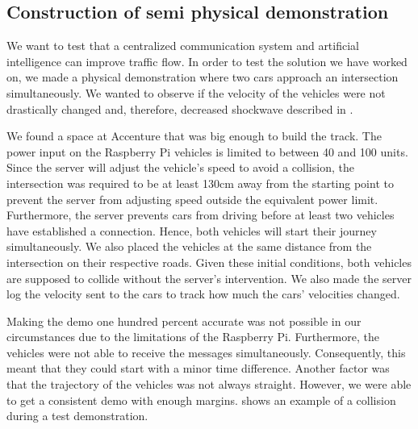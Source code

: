 \subsection{Construction of semi physical demonstration}\label{sec:demo}
We want to test that a centralized communication system and artificial intelligence can improve traffic flow. In order to test the solution we have worked on, we made a physical demonstration where two cars approach an intersection simultaneously. We wanted to observe if the velocity of the vehicles were not drastically changed and, therefore, decreased shockwave described in .

We found a space at Accenture that was big enough to build the track. The power input on the Raspberry Pi vehicles is limited to between 40 and 100 units. Since the server will adjust the vehicle's speed to avoid a collision, the intersection was required to be at least 130cm away from the starting point to prevent the server from adjusting speed outside the equivalent power limit. Furthermore, the server prevents cars from driving before at least two vehicles have established a connection. Hence, both vehicles will start their journey simultaneously. We also placed the vehicles at the same distance from the intersection on their respective roads. Given these initial conditions, both vehicles are supposed to collide without the server's intervention. We also made the server log the velocity sent to the cars to track how much the cars' velocities changed.

Making the demo one hundred percent accurate was not possible in our circumstances due to the limitations of the Raspberry Pi. Furthermore, the vehicles were not able to receive the messages simultaneously. Consequently, this meant that they could start with a minor time difference. Another factor was that the trajectory of the vehicles was not always straight. However, we were able to get a consistent demo with enough margins.  shows an example of a collision during a test demonstration.

